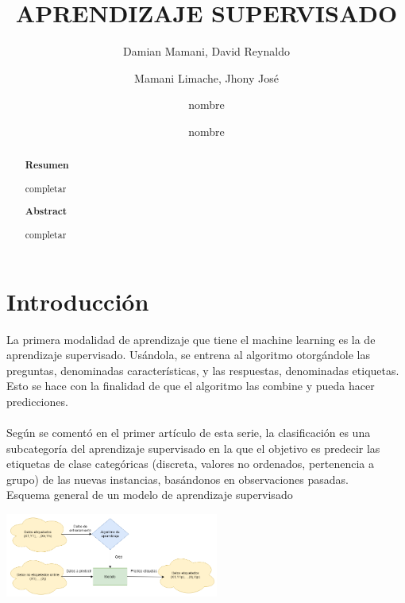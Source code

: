 \documentclass[%
 reprint,
 amsmath,amssymb,
 aps,
]{revtex4-1}
\begin{document}
\title{ APRENDIZAJE SUPERVISADO}
\author{Damian Mamani, David Reynaldo
\and Mamani Limache, Jhony José 
\and nombre  
\and nombre }
		
%

\begin{abstract}
\begin{center}
\textbf{Resumen}
\end{center}
completar
\\

\begin{center}
\textbf{Abstract}
\end{center}
completar
\\
\end{abstract}



\maketitle


\section {Introducción}\label{sec:1}
La primera modalidad de aprendizaje que tiene el machine learning es la de aprendizaje supervisado. Usándola, se entrena al algoritmo otorgándole las preguntas, denominadas características, y las respuestas, denominadas etiquetas. Esto se hace con la finalidad de que el algoritmo las combine y pueda hacer predicciones.\\\\
Según se comentó en el primer artículo de esta serie, la clasificación es una subcategoría del aprendizaje supervisado en la que el objetivo es predecir las etiquetas de clase categóricas (discreta, valores no ordenados, pertenencia a grupo) de las nuevas instancias, basándonos en observaciones pasadas.\\
Esquema general de un modelo de aprendizaje supervisado
\begin{center}
\includegraphics[width=7cm]{./Imagenes/esquemageneraldelmodelosupervisado}
\end{center}
 
\end{document}
